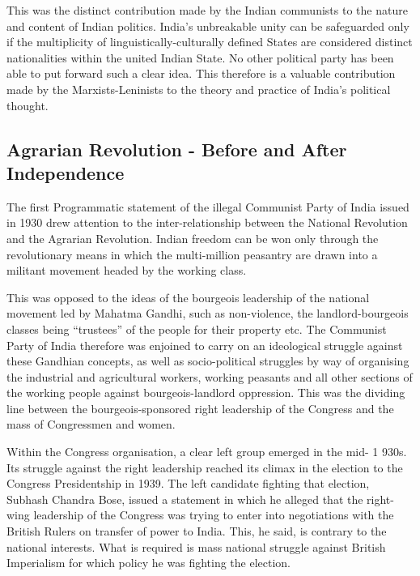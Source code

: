 This was the distinct contribution made by the Indian communists to the nature and content of Indian politics. India’s unbreakable unity can be safeguarded only if the multiplicity of linguistically-culturally defined States are considered distinct nationalities within the united Indian State. No other political party has been able to put forward such a clear idea. This therefore is a valuable contribution made by the Marxists-Leninists to the theory and practice of India’s political thought. 

\subsection{Agrarian Revolution - Before and After Independence} 

The first Programmatic statement of the illegal Communist Party of India issued in 1930 drew attention to the inter-relationship between the National Revolution and the Agrarian Revolution. Indian freedom can be won only through the revolutionary means in which the multi-million peasantry are drawn into a militant movement headed by the working class. 

This was opposed to the ideas of the bourgeois leadership of the national movement led by Mahatma Gandhi, such as non-violence, the landlord-bourgeois classes being “trustees” of the people for their property etc. The Communist Party of India therefore was enjoined to carry on an ideological struggle against these Gandhian concepts, as well as socio-political struggles by way of organising the industrial and agricultural workers, working peasants and all other sections of the working people against bourgeois-landlord oppression. This was the dividing line between the bourgeois-sponsored right leadership of the Congress and the mass of Congressmen and women. 

Within the Congress organisation, a clear left group emerged in the mid- 1 930s. Its struggle against the right leadership reached its climax in the election to the Congress Presidentship in 1939. The left candidate fighting that election, Subhash Chandra Bose, issued a statement in which he alleged that the right-wing leadership of the Congress was trying to enter into negotiations with the British Rulers on transfer of power to India. This, he said, is contrary to the national interests. What is required is mass national struggle against British Imperialism for which policy he was fighting the election. 


